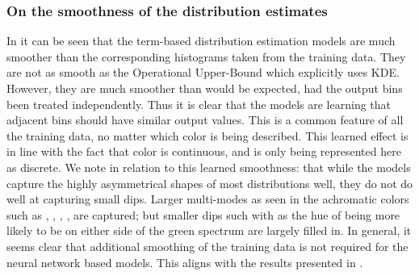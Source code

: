 \documentclass[11pt,a4paper]{article}
\begin{document}
\subsubsection{On the smoothness of the distribution estimates}\label{sec:learnedsmoothness}
In  it can be seen that the term-based distribution estimation models are much smoother than the corresponding histograms taken from the  training data.
They are not as smooth as the Operational Upper-Bound which explicitly uses KDE.
However, they are much smoother than would be expected, had the output bins been treated independently.
Thus it is clear that the models are learning that adjacent bins should have similar output values.
This is a common feature of all the training data, no matter which color is being described.
This learned effect is in line with the fact that color is continuous, and is only being represented here as discrete.
We note in relation to this learned smoothness: that while the models capture the highly asymmetrical shapes of most distributions well, they do not do well at capturing small dips.
Larger multi-modes as seen in the achromatic colors such as , , , , are captured; but smaller dips such with as the hue of  being more likely to be on either side of the green spectrum are largely filled in.
In general, it seems clear that additional smoothing of the training data is not required for the neural network based models.
This aligns with the results presented in .




\end{document}
